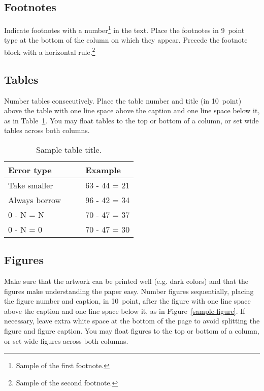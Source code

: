 \documentclass[10pt,letterpaper]{article}
\begin{document}
\subsection{Footnotes}

Indicate footnotes with a number\footnote{Sample of the first
footnote.} in the text. Place the footnotes in 9~point type at the
bottom of the column on which they appear. Precede the footnote block
with a horizontal rule.\footnote{Sample of the second footnote.}


\subsection{Tables}

Number tables consecutively. Place the table number and title (in
10~point) above the table with one line space above the caption and
one line space below it, as in Table~\ref{sample-table}. You may float
tables to the top or bottom of a column, or set wide tables across
both columns.

\begin{table}[!ht]
\begin{center} 
\caption{Sample table title.} 
\label{sample-table} 
\vskip 0.12in
\begin{tabular}{ll} 
\hline
Error type    &  Example \\
\hline
Take smaller        &   63 - 44 = 21 \\
Always borrow~~~~   &   96 - 42 = 34 \\
0 - N = N           &   70 - 47 = 37 \\
0 - N = 0           &   70 - 47 = 30 \\
\hline
\end{tabular} 
\end{center} 
\end{table}


\subsection{Figures}

Make sure that the artwork can be printed well (e.g. dark colors) and that 
the figures make understanding the paper easy.
 Number figures sequentially, placing the figure
number and caption, in 10~point, after the figure with one line space
above the caption and one line space below it, as in
Figure~\ref{sample-figure}. If necessary, leave extra white space at
the bottom of the page to avoid splitting the figure and figure
caption. You may float figures to the top or bottom of a column, or
set wide figures across both columns.
\end{document}
